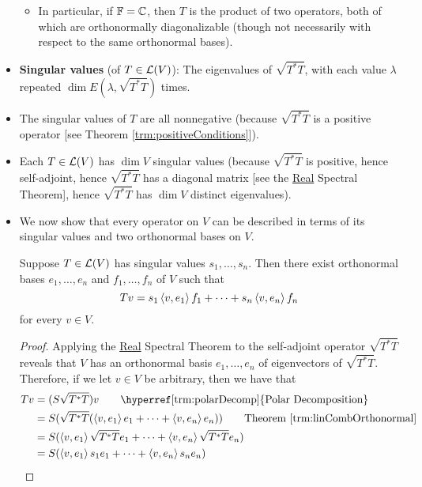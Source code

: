\documentclass[../main.tex]{subfiles}
\begin{document}
\begin{itemize}
    \begin{itemize}
        \item In particular, if $\mathbb{F}=\mathbb{C}$, then $T$ is the product of two operators, both of which are orthonormally diagonalizable (though not necessarily with respect to the same orthonormal bases).
    \end{itemize}
    \item \textbf{Singular values} (of $T\in\mathcal{L}(V)$): The eigenvalues of $\sqrt{T^*T}$, with each value $\lambda$ repeated $\dim E(\lambda,\sqrt{T^*T})$ times.
    \item The singular values of $T$ are all nonnegative (because $\sqrt{T^*T}$ is a positive operator [see Theorem \ref{trm:positiveConditions}]). 
    \item Each $T\in\mathcal{L}(V)$ has $\dim V$ singular values (because $\sqrt{T^*T}$ is positive, hence self-adjoint, hence $\sqrt{T^*T}$ has a diagonal matrix [see the \hyperref[trm:RealSpectral]{Real} Spectral Theorem], hence $\sqrt{T^*T}$ has $\dim V$ distinct eigenvalues).
    \item We now show that every operator on $V$ can be described in terms of its singular values and two orthonormal bases on $V$.
    \begin{theorem}\label{trm:SVD}
        Suppose $T\in\mathcal{L}(V)$ has singular values $s_1,\dots,s_n$. Then there exist orthonormal bases $e_1,\dots,e_n$ and $f_1,\dots,f_n$ of $V$ such that
        \begin{equation*}
            Tv = s_1\left\langle{v},{e_1}\right\rangle f_1+\cdots+s_n\left\langle{v},{e_n}\right\rangle f_n
        \end{equation*}
        for every $v\in V$.
        \begin{proof}
            Applying the \hyperref[trm:RealSpectral]{Real} Spectral Theorem to the self-adjoint operator $\sqrt{T^*T}$ reveals that $V$ has an orthonormal basis $e_1,\dots,e_n$ of eigenvectors of $\sqrt{T^*T}$. Therefore, if we let $v\in V$ be arbitrary, then we have that
            \begin{align*}
                Tv &= (S\sqrt{T^*T})v\tag*{\hyperref[trm:polarDecomp]{Polar Decomposition}}\\
                &= S(\sqrt{T^*T}(\inp{v}{e_1}e_1+\cdots+\inp{v}{e_n}e_n))\tag*{Theorem \ref{trm:linCombOrthonormal}}\\
                &= S(\inp{v}{e_1}\sqrt{T^*T}e_1+\cdots+\inp{v}{e_n}\sqrt{T^*T}e_n)\\
                &= S(\inp{v}{e_1}s_1e_1+\cdots+\inp{v}{e_n}s_ne_n)\\

\end{align*}
\end{proof}
\end{theorem}
\end{itemize}
\end{document}
